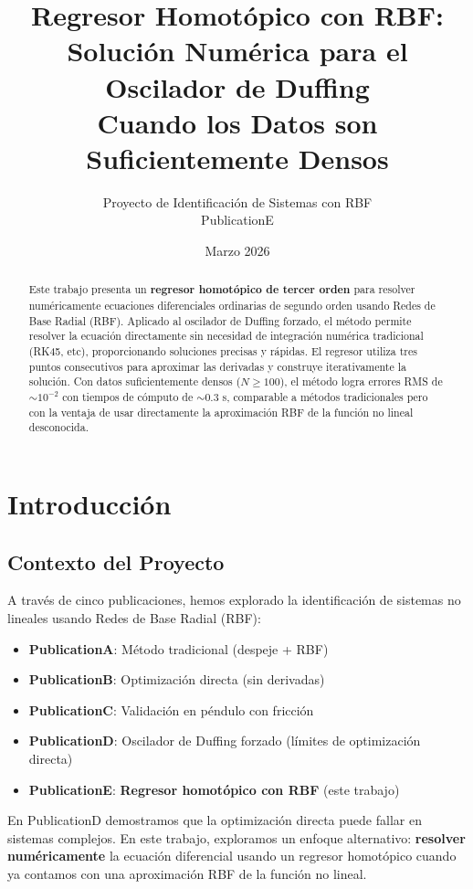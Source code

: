 \documentclass[11pt,a4paper]{article}
\title{\textbf{Regresor Homotópico con RBF:\\Solución Numérica para el Oscilador de Duffing}\\[0.5em]
\large Cuando los Datos son Suficientemente Densos}
\author{Proyecto de Identificación de Sistemas con RBF\\PublicationE}
\date{Marzo 2026}
\begin{document}
\maketitle

\begin{abstract}
Este trabajo presenta un \textbf{regresor homotópico de tercer orden} para resolver numéricamente ecuaciones diferenciales ordinarias de segundo orden usando Redes de Base Radial (RBF). Aplicado al oscilador de Duffing forzado, el método permite resolver la ecuación directamente sin necesidad de integración numérica tradicional (RK45, etc), proporcionando soluciones precisas y rápidas. El regresor utiliza tres puntos consecutivos para aproximar las derivadas y construye iterativamente la solución. Con datos suficientemente densos ($N \geq 100$), el método logra errores RMS de $\sim 10^{-2}$ con tiempos de cómputo de $\sim 0.3$ s, comparable a métodos tradicionales pero con la ventaja de usar directamente la aproximación RBF de la función no lineal desconocida.
\end{abstract}

\section{Introducción}

\subsection{Contexto del Proyecto}

A través de cinco publicaciones, hemos explorado la identificación de sistemas no lineales usando Redes de Base Radial (RBF):

\begin{itemize}
\item \textbf{PublicationA}: Método tradicional (despeje + RBF)
\item \textbf{PublicationB}: Optimización directa (sin derivadas)
\item \textbf{PublicationC}: Validación en péndulo con fricción
\item \textbf{PublicationD}: Oscilador de Duffing forzado (límites de optimización directa)
\item \textbf{PublicationE}: \textbf{Regresor homotópico con RBF} (este trabajo)
\end{itemize}

En PublicationD demostramos que la optimización directa puede fallar en sistemas complejos. En este trabajo, exploramos un enfoque alternativo: \textbf{resolver numéricamente} la ecuación diferencial usando un regresor homotópico cuando ya contamos con una aproximación RBF de la función no lineal.
\end{document}
